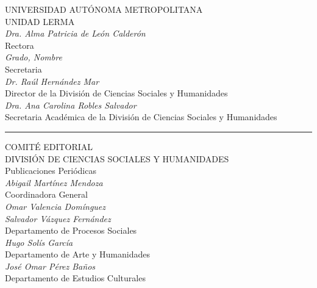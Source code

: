 \begin{center}
    \sffamily\small
    
    {\normalsize UNIVERSIDAD AUTÓNOMA METROPOLITANA} \\
    {\normalsize UNIDAD LERMA} \\
    \vspace{0.2cm}
    {\itshape Dra. Alma Patricia de León Calderón} \\
    Rectora \\
    \vspace{0.4cm}
    {\itshape Grado, Nombre} \\
    Secretaria \\
    \vspace{0.4cm}
    {\itshape Dr. Raúl Hernández Mar} \\
    Director de la División de Ciencias Sociales y Humanidades \\
    \vspace{0.4cm}
    {\itshape Dra. Ana Carolina Robles Salvador} \\
    Secretaria Académica de la División de Ciencias Sociales y Humanidades \\
    
    \vspace{0.6cm}
    \rule{0.6\textwidth}{0.4pt}
    \vspace{0.6cm}
    
    {\small COMITÉ EDITORIAL} \\
    {\small DIVISIÓN DE CIENCIAS SOCIALES Y HUMANIDADES} \\
    Publicaciones Periódicas \\
    \vspace{0.4cm}
    {\itshape Abigail Martínez Mendoza} \\
    Coordinadora General \\
    \vspace{0.4cm}
    {\itshape Omar Valencia Domínguez} \\
    {\itshape Salvador Vázquez Fernández} \\
    Departamento de Procesos Sociales \\
    \vspace{0.4cm}
    {\itshape Hugo Solís García} \\
    Departamento de Arte y Humanidades \\
    \vspace{0.4cm}
    {\itshape José Omar Pérez Baños} \\
    Departamento de Estudios Culturales \\
    

\end{center}
